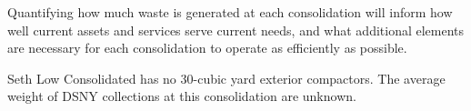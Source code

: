 
    Quantifying how much waste is generated at each consolidation will inform how well current assets and services serve current needs, and what additional elements are necessary for each consolidation to operate as efficiently as possible.
    
    Seth Low Consolidated has no 30-cubic yard exterior compactors. The average weight of DSNY collections at this consolidation are unknown.